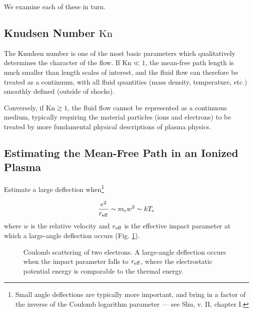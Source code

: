 \documentclass[notoc]{tufte-handout}
\begin{document}
We examine each of these in turn.

\subsection{Knudsen Number \texorpdfstring{$\mathrm{Kn}$}{Kn}}

The Knudsen number is one of the most basic parameters which qualitatively determines the character of the flow. If $\mathrm{Kn} \ll 1$, the mean-free path length is much smaller than length scales of interest, and the fluid flow can therefore be treated as a continuum, with all fluid quantities (mass density, temperature, etc.) smoothly defined (outside of shocks). 

Conversely, if $\mathrm{Kn} \gtrsim 1$, the fluid flow cannot be represented as a continuous medium, typically requiring the material particles (ions and electrons) to be treated by more fundamental physical descriptions of plasma physics.

\subsection{Estimating the Mean-Free Path in an Ionized Plasma}

Estimate a large deflection when\footnote{Small angle deflections are typically more important, and bring in a factor of the inverse of the Coulomb logarithm parameter --- see Shu, v. II, chapter I.}

\begin{equation}
\frac{e^2}{r_{\rm eff}} \sim m_e w^2 \sim k T_e
\end{equation}
%
where $w$ is the relative velocity and $r_{\rm eff}$ is the effective impact parameter at which a large-angle deflection occurs (Fig. \ref{fig:scattering}).

\begin{figure}[htbp]
\centering
{}
\caption{Coulomb scattering of two electrons. A large-angle deflection occurs when the impact parameter falls to $r_{\rm eff}$, where the electrostatic potential energy is comparable to the thermal energy.}
\label{fig:scattering}
\end{figure}
\end{document}
